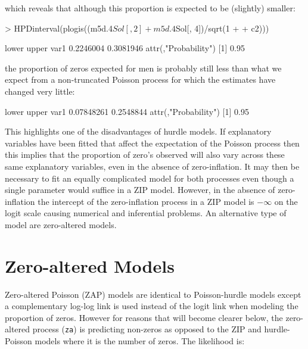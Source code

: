 \documentclass{article}
\begin{document}
which reveals that although this proportion is expected to be (slightly) smaller: 


\begin{Schunk}
\begin{Sinput}
> HPDinterval(plogis((m5d.4$Sol[, 2] + m5d.4$Sol[, 4])/sqrt(1 + 
+     c2)))
\end{Sinput}
\begin{Soutput}
         lower     upper
var1 0.2246004 0.3081946
attr(,"Probability")
[1] 0.95
\end{Soutput}
\end{Schunk}


the proportion of zeros expected for men is probably still less than what we expect from a non-truncated Poisson process for which the estimates have changed very little:

\begin{Schunk}
\begin{Soutput}
          lower     upper
var1 0.07848261 0.2548844
attr(,"Probability")
[1] 0.95
\end{Soutput}
\end{Schunk}


This highlights one of the disadvantages of hurdle models. If explanatory variables have been fitted that affect the expectation of the Poisson process then this implies that the proportion of zero's observed will also vary across these same explanatory variables, even in the absence of zero-inflation. It may then be necessary to fit an equally complicated model for both processes even though a single parameter would suffice in a ZIP model. However, in the absence of zero-inflation the intercept of the zero-inflation process in a ZIP model is $-\infty$ on the logit scale causing numerical and inferential problems. An alternative type of model are zero-altered models. 

\section{Zero-altered Models}
\label{ZAP}

Zero-altered Poisson (ZAP) models are identical to Poisson-hurdle models except a complementary log-log link is used instead of the logit link when modeling the proportion of zeros. However for reasons that will become clearer below, the zero-altered process (\texttt{za}) is predicting non-zeros as opposed to the ZIP and hurdle-Poisson models where it is the number of zeros.  The likelihood is:
\end{document}
